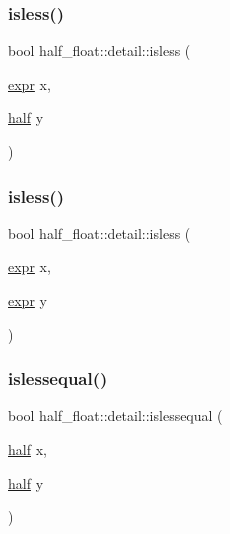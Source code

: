 \subsubsection{\texorpdfstring{isless()}{isless()}\hspace{0.1cm}{\footnotesize\ttfamily [3/4]}}
{\footnotesize\ttfamily bool half\+\_\+float\+::detail\+::isless (\begin{DoxyParamCaption}\item[{\hyperlink{structhalf__float_1_1detail_1_1expr}{expr}}]{x,  }\item[{\hyperlink{classhalf__float_1_1half}{half}}]{y }\end{DoxyParamCaption})\hspace{0.3cm}{\ttfamily [inline]}}

\mbox{\label{namespacehalf__float_1_1detail_a911db07a9c4a7307537a77d0a1b63020}} 
\subsubsection{\texorpdfstring{isless()}{isless()}\hspace{0.1cm}{\footnotesize\ttfamily [4/4]}}
{\footnotesize\ttfamily bool half\+\_\+float\+::detail\+::isless (\begin{DoxyParamCaption}\item[{\hyperlink{structhalf__float_1_1detail_1_1expr}{expr}}]{x,  }\item[{\hyperlink{structhalf__float_1_1detail_1_1expr}{expr}}]{y }\end{DoxyParamCaption})\hspace{0.3cm}{\ttfamily [inline]}}

\mbox{\label{namespacehalf__float_1_1detail_ac4890222c4073ad446d877c321b335d6}} 
\subsubsection{\texorpdfstring{islessequal()}{islessequal()}\hspace{0.1cm}{\footnotesize\ttfamily [1/4]}}
{\footnotesize\ttfamily bool half\+\_\+float\+::detail\+::islessequal (\begin{DoxyParamCaption}\item[{\hyperlink{classhalf__float_1_1half}{half}}]{x,  }\item[{\hyperlink{classhalf__float_1_1half}{half}}]{y }\end{DoxyParamCaption})\hspace{0.3cm}{\ttfamily [inline]}}

